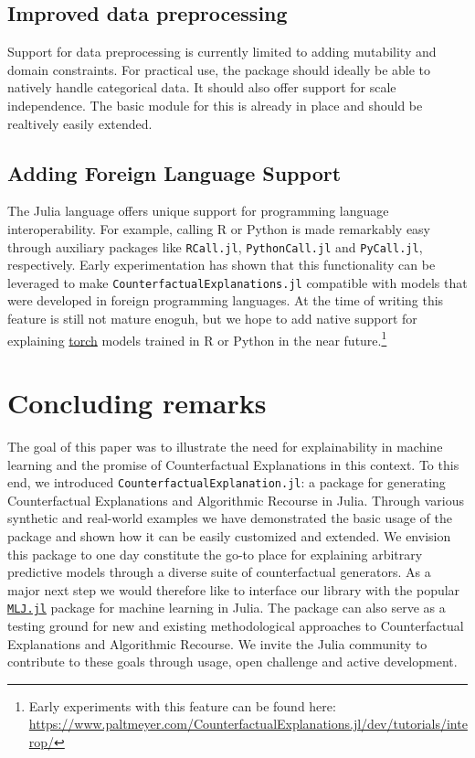 \documentclass[
  letterpaper,
  DIV=11,
  numbers=noendperiod]{scrartcl}
\begin{document}
\hypertarget{improved-data-preprocessing}{%
\subsection{Improved data
preprocessing}\label{improved-data-preprocessing}}

Support for data preprocessing is currently limited to adding mutability
and domain constraints. For practical use, the package should ideally be
able to natively handle categorical data. It should also offer support
for scale independence. The basic module for this is already in place
and should be realtively easily extended.

\hypertarget{sec-dis-foreign}{%
\subsection{Adding Foreign Language Support}\label{sec-dis-foreign}}

The Julia language offers unique support for programming language
interoperability. For example, calling R or Python is made remarkably
easy through auxiliary packages like \texttt{RCall.jl},
\texttt{PythonCall.jl} and \texttt{PyCall.jl}, respectively. Early
experimentation has shown that this functionality can be leveraged to
make \texttt{CounterfactualExplanations.jl} compatible with models that
were developed in foreign programming languages. At the time of writing
this feature is still not mature enoguh, but we hope to add native
support for explaining \href{https://pytorch.org/}{torch} models trained
in R or Python in the near future.\footnote{Early experiments with this
  feature can be found here:
  \url{https://www.paltmeyer.com/CounterfactualExplanations.jl/dev/tutorials/interop/}}

\hypertarget{sec-conclude}{%
\section{Concluding remarks}\label{sec-conclude}}

The goal of this paper was to illustrate the need for explainability in
machine learning and the promise of Counterfactual Explanations in this
context. To this end, we introduced
\texttt{CounterfactualExplanation.jl}: a package for generating
Counterfactual Explanations and Algorithmic Recourse in Julia. Through
various synthetic and real-world examples we have demonstrated the basic
usage of the package and shown how it can be easily customized and
extended. We envision this package to one day constitute the go-to place
for explaining arbitrary predictive models through a diverse suite of
counterfactual generators. As a major next step we would therefore like
to interface our library with the popular
\href{https://alan-turing-institute.github.io/MLJ.jl/dev/}{\texttt{MLJ.jl}}
package for machine learning in Julia. The package can also serve as a
testing ground for new and existing methodological approaches to
Counterfactual Explanations and Algorithmic Recourse. We invite the
Julia community to contribute to these goals through usage, open
challenge and active development.
\end{document}
